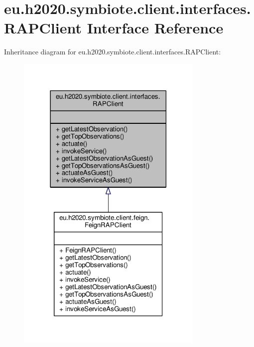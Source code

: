 \hypertarget{interfaceeu_1_1h2020_1_1symbiote_1_1client_1_1interfaces_1_1RAPClient}{}\section{eu.\+h2020.\+symbiote.\+client.\+interfaces.\+R\+A\+P\+Client Interface Reference}
\label{interfaceeu_1_1h2020_1_1symbiote_1_1client_1_1interfaces_1_1RAPClient}


Inheritance diagram for eu.\+h2020.\+symbiote.\+client.\+interfaces.\+R\+A\+P\+Client\+:
\nopagebreak
\begin{figure}[H]
\begin{center}
\leavevmode
\includegraphics[width=254pt]{interfaceeu_1_1h2020_1_1symbiote_1_1client_1_1interfaces_1_1RAPClient__inherit__graph}
\end{center}
\end{figure}


